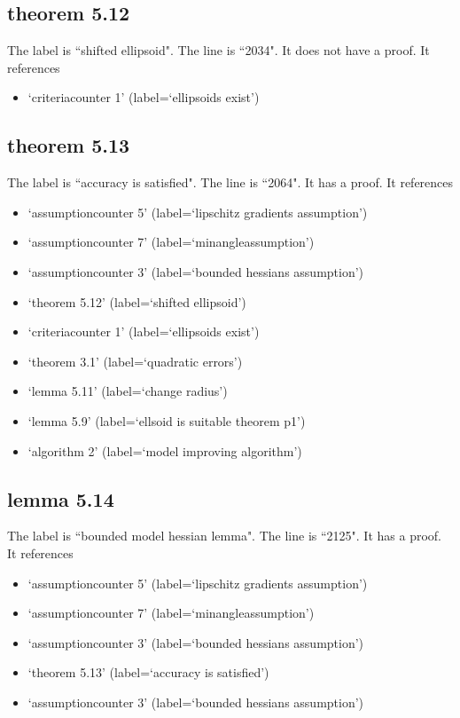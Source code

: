 \documentclass{article}
\begin{document}
\subsection{theorem 5.12}
The label is ``shifted ellipsoid".
The line is ``2034".
It does not have a proof.
It references \begin{itemize}
\item `criteriacounter 1' (label=`ellipsoids exist')
\end{itemize}
\subsection{theorem 5.13}
The label is ``accuracy is satisfied".
The line is ``2064".
It has a proof.
It references \begin{itemize}
\item `assumptioncounter 5' (label=`lipschitz gradients assumption')
\item `assumptioncounter 7' (label=`minangleassumption')
\item `assumptioncounter 3' (label=`bounded hessians assumption')
\item `theorem 5.12' (label=`shifted ellipsoid')
\item `criteriacounter 1' (label=`ellipsoids exist')
\item `theorem 3.1' (label=`quadratic errors')
\item `lemma 5.11' (label=`change radius')
\item `lemma 5.9' (label=`ellsoid is suitable theorem p1')
\item `algorithm 2' (label=`model improving algorithm')
\end{itemize}
\subsection{lemma 5.14}
The label is ``bounded model hessian lemma".
The line is ``2125".
It has a proof.
It references \begin{itemize}
\item `assumptioncounter 5' (label=`lipschitz gradients assumption')
\item `assumptioncounter 7' (label=`minangleassumption')
\item `assumptioncounter 3' (label=`bounded hessians assumption')
\item `theorem 5.13' (label=`accuracy is satisfied')
\item `assumptioncounter 3' (label=`bounded hessians assumption')
\end{itemize}
\end{document}
